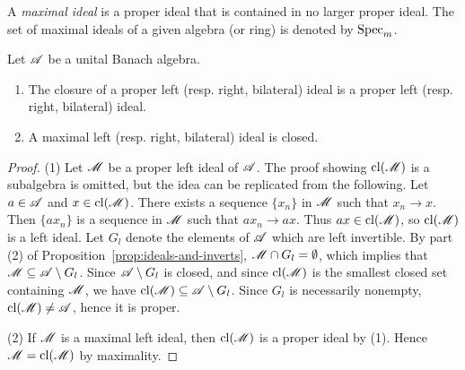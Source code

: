 \begin{definition}
	A \emph{maximal ideal} is a proper ideal that is contained in no larger proper ideal. The set of maximal ideals of a given algebra (or ring) is denoted by $\operatorname{Spec}_m$.
\end{definition}

\begin{corollary}
	Let $\mathscr{A}$ be a unital Banach algebra.
	\mbox{}
	\begin{enumerate}[label = (\arabic*),itemsep=1pt,topsep=3pt]
		\item The closure of a proper left (resp. right, bilateral) ideal is a proper left (resp. right, bilateral) ideal.
		\item A maximal left (resp. right, bilateral) ideal is closed.
	\end{enumerate}
\end{corollary}
	\begin{proof}
		(1) Let $\mathscr{M}$ be a proper left ideal of $\mathscr{A}$. The proof showing $\operatorname{cl}(\mathscr{M})$ is a subalgebra is omitted, but the idea can be replicated from the following. Let $a \in \mathscr{A}$ and $x \in \operatorname{cl}(\mathscr{M})$. There exists a sequence $\{x_n\}$ in $\mathscr{M}$ such that $x_n \rightarrow x$. Then $\{a x_n\}$ is a sequence in $\mathscr{M}$ such that $a x_n \rightarrow ax$. Thus $ax \in \operatorname{cl}(\mathscr{M})$, so $\operatorname{cl}(\mathscr{M})$ is a left ideal. Let $G_l$ denote the elements of $\mathscr{A}$ which are left invertible. By part (2) of Proposition~\ref{prop:ideals-and-inverts}, $\mathscr{M} \cap G_l = \emptyset$, which implies that $\mathscr{M} \subseteq \mathscr{A} \setminus G_l$. Since $\mathscr{A} \setminus G_l$ is closed, and since $\operatorname{cl}(\mathscr{M})$ is the smallest closed set containing $\mathscr{M}$, we have $\operatorname{cl}(\mathscr{M}) \subseteq \mathscr{A} \setminus G_l$. Since $G_l$ is necessarily nonempty, $\operatorname{cl}(\mathscr{M}) \neq \mathscr{A}$, hence it is proper.

		(2) If $\mathscr{M}$ is a maximal left ideal, then $\operatorname{cl}(\mathscr{M})$ is a proper ideal by (1). Hence $\mathscr{M} = \operatorname{cl}(\mathscr{M})$ by maximality.
	\end{proof}

